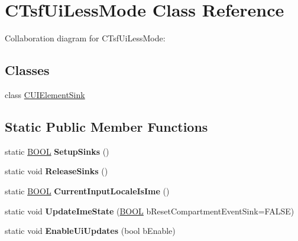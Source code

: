 \hypertarget{class_c_tsf_ui_less_mode}{\section{C\+Tsf\+Ui\+Less\+Mode Class Reference}
\label{class_c_tsf_ui_less_mode}
}


Collaboration diagram for C\+Tsf\+Ui\+Less\+Mode\+:
\subsection*{Classes}
\begin{DoxyCompactItemize}
\item 
class \hyperlink{class_c_tsf_ui_less_mode_1_1_c_u_i_element_sink}{C\+U\+I\+Element\+Sink}
\end{DoxyCompactItemize}
\subsection*{Static Public Member Functions}
\begin{DoxyCompactItemize}
\item 
\hypertarget{class_c_tsf_ui_less_mode_aeb8efe9cd0370454757344a6d1f6910b}{static \hyperlink{_ice_types_8h_a050c65e107f0c828f856a231f4b4e788}{B\+O\+O\+L} {\bfseries Setup\+Sinks} ()}\label{class_c_tsf_ui_less_mode_aeb8efe9cd0370454757344a6d1f6910b}

\item 
\hypertarget{class_c_tsf_ui_less_mode_a72a3a7da66da36e5c5e18755de615ea8}{static void {\bfseries Release\+Sinks} ()}\label{class_c_tsf_ui_less_mode_a72a3a7da66da36e5c5e18755de615ea8}

\item 
\hypertarget{class_c_tsf_ui_less_mode_af9fe01b2d6212b2ec26320931464d079}{static \hyperlink{_ice_types_8h_a050c65e107f0c828f856a231f4b4e788}{B\+O\+O\+L} {\bfseries Current\+Input\+Locale\+Is\+Ime} ()}\label{class_c_tsf_ui_less_mode_af9fe01b2d6212b2ec26320931464d079}

\item 
\hypertarget{class_c_tsf_ui_less_mode_aabc9c7c0b6e294525abfabfb72d41f52}{static void {\bfseries Update\+Ime\+State} (\hyperlink{_ice_types_8h_a050c65e107f0c828f856a231f4b4e788}{B\+O\+O\+L} b\+Reset\+Compartment\+Event\+Sink=F\+A\+L\+S\+E)}\label{class_c_tsf_ui_less_mode_aabc9c7c0b6e294525abfabfb72d41f52}

\item 
\hypertarget{class_c_tsf_ui_less_mode_a57e3cf8ae41f8246bdf9f924484fa7e2}{static void {\bfseries Enable\+Ui\+Updates} (bool b\+Enable)}\label{class_c_tsf_ui_less_mode_a57e3cf8ae41f8246bdf9f924484fa7e2}

\end{DoxyCompactItemize}

